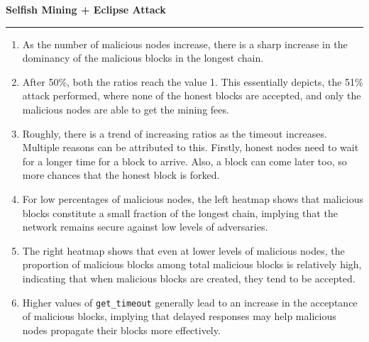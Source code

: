 \documentclass[a4paper,12pt]{article}
\newenvironment{solution}[2][]{%
\begin{mdframed}[linecolor=blue!70!black, linewidth=2pt, roundcorner=10pt, backgroundcolor=yellow!10!white, skipabove=12pt, skipbelow=12pt]%
	\textbf{\large #2}
	\par\noindent\rule{\textwidth}{0.4pt}
}{
\end{mdframed}
}
\begin{document}
\begin{solution}{Selfish Mining + Eclipse Attack}
	\begin{enumerate}
		\item As the number of malicious nodes increase, there is a sharp increase in the dominancy of the malicious blocks in the longest chain. 
		\item After 50\%, both the ratios reach the value 1. This essentially depicts, the 51\% attack performed, where none of the honest blocks are accepted, and only the malicious nodes are able to get the mining fees.
		\item Roughly, there is a trend of increasing ratios as the timeout increases. Multiple reasons can be attributed to this. Firstly, honest nodes need to wait for a longer time for a block to arrive. Also, a block can come later too, so more chances that the honest block is forked.
		\item For low percentages of malicious nodes, the left heatmap shows that malicious blocks constitute a small fraction of the longest chain, implying that the network remains secure against low levels of adversaries. 
		\item The right heatmap shows that even at lower levels of malicious nodes, the proportion of malicious blocks among total malicious blocks is relatively high, indicating that when malicious blocks are created, they tend to be accepted. 
		\item Higher values of \texttt{get\_timeout} generally lead to an increase in the acceptance of malicious blocks, implying that delayed responses may help malicious nodes propagate their blocks more effectively. 
	\end{enumerate}
\end{solution}
\clearpage
\end{document}

